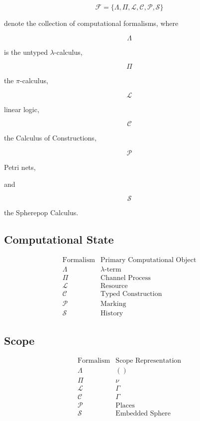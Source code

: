 \documentclass[12pt,oneside]{article}
\theoremstyle{definition}
\theoremstyle{remark}
\begin{document}
\[
\mathcal F
=
\{
\Lambda,
\Pi,
\mathcal L,
\mathcal C,
\mathcal P,
\mathcal S
\}
\]

denote the collection of computational formalisms, where

\[
\Lambda
\]

is the untyped $\lambda$-calculus,

\[
\Pi
\]

the $\pi$-calculus,

\[
\mathcal L
\]

linear logic,

\[
\mathcal C
\]

the Calculus of Constructions,

\[
\mathcal P
\]

Petri nets,

and

\[
\mathcal S
\]

the Spherepop Calculus.

\subsection*{Computational State}

\[
\begin{array}{c|c}
\text{Formalism}
&
\text{Primary Computational Object}
\\
\hline
\Lambda
&
\lambda\text{-term}
\\
\Pi
&
\text{Channel Process}
\\
\mathcal L
&
\text{Resource}
\\
\mathcal C
&
\text{Typed Construction}
\\
\mathcal P
&
\text{Marking}
\\
\mathcal S
&
\text{History}
\end{array}
\]

\subsection*{Scope}

\[
\begin{array}{c|c}
\text{Formalism}
&
\text{Scope Representation}
\\
\hline
\Lambda
&
()
\\
\Pi
&
\nu
\\
\mathcal L
&
\Gamma
\\
\mathcal C
&
\Gamma
\\
\mathcal P
&
\text{Places}
\\
\mathcal S
&
\text{Embedded Sphere}
\end{array}
\]
\end{document}
